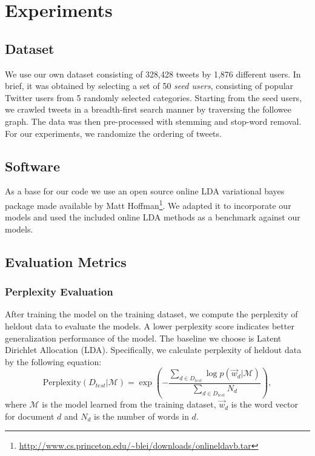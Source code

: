 \section{Experiments}
%
%
\subsection{Dataset}\label{sec:data}
%
We use our own dataset consisting of 328,428 tweets by 1,876 different users. In brief, it was obtained by selecting a set of 50 \textit{seed users}, consisting of popular Twitter users from 5 randomly selected categories. Starting from the seed users, we crawled tweets in a breadth-first search manner by traversing the followee graph. The data was then pre-processed with stemming and stop-word removal. For our experiments, we randomize the ordering of tweets.
%
\subsection{Software}\label{sec:code}
%
As a base for our code we use an open source online LDA variational bayes package made available by Matt Hoffman\footnote{\url{http://www.cs.princeton.edu/~blei/downloads/onlineldavb.tar}}. We adapted it to incorporate our models and used the included online LDA methods as a benchmark against our models.
%
\subsection{Evaluation Metrics}
\subsubsection{Perplexity Evaluation}
%
%
%
After training the model on the training dataset, we compute the perplexity of heldout data to evaluate the models.
%
A lower perplexity score indicates better generalization performance of the model. The baseline we choose is Latent Dirichlet Allocation (LDA). Specifically, we calculate perplexity of heldout data by the following equation:
%
\vspace{-1mm}
%
\begin{equation}
	\textrm{Perplexity}({D}_{test}|\mathcal{M})=\exp(-\frac{{\sum}_{d\in D_{test}} \log p(\overrightarrow{w}_{d}|\mathcal{M})}{{\sum}_{d\in D_{test}} N_d}),
\end{equation}
%
\noindent where $\mathcal{M}$ is the model learned from the training dataset, $\overrightarrow{w}_{d}$ is the word vector for document $d$ and $N_d$ is the number of words in $d$.
%
